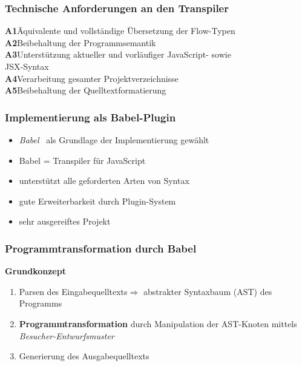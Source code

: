    \begin{frame}
      \frametitle{Technische Anforderungen an den Transpiler}
      \textbf{A1}\hspace{0.75em}Äquivalente und vollständige Übersetzung der Flow-Typen\\[.6em]
      \textbf{A2}\hspace{0.75em}Beibehaltung der Programmsemantik\\[.6em]
      \textbf{A3}\hspace{0.75em}Unterstützung aktueller und vorläufiger JavaScript- sowie\\\hspace{2.05em}JSX-Syntax\\[.6em]
      \textbf{A4}\hspace{0.75em}Verarbeitung gesamter Projektverzeichnisse\\[.6em]
      \textbf{A5}\hspace{0.75em}Beibehaltung der Quelltextformatierung
    \end{frame}

    \begin{frame}
      \frametitle{Implementierung als Babel-Plugin}
      \begin{itemize}
        \item \textit{Babel}~\autocite{BABEL} als Grundlage der Implementierung gewählt
        \item Babel = Transpiler für JavaScript
        \item unterstützt alle geforderten Arten von Syntax
        \item gute Erweiterbarkeit durch Plugin-System
        \item sehr ausgereiftes Projekt
      \end{itemize}
    \end{frame}

    \begin{frame}
      \frametitle{Programmtransformation durch Babel}
      \textbf{\large Grundkonzept}
      \vspace{1em}
      \begin{enumerate}
        \item Parsen des Eingabequelltexts\linebreak$\Rightarrow$ abstrakter Syntaxbaum (AST) des Programms\\
        \smallskip
        \item \textbf{Programmtransformation} durch Manipulation der AST-Knoten mittels \textit{Besucher-Entwurfsmuster}\\
        \smallskip
        \item Generierung des Ausgabequelltexts
      \end{enumerate}
    \end{frame}

